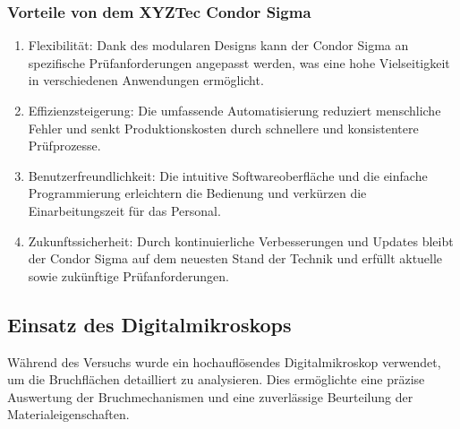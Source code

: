 \subsubsection{Vorteile von dem XYZTec Condor Sigma}
\begin{enumerate}
    \item Flexibilität: Dank des modularen Designs kann der Condor Sigma an spezifische Prüfanforderungen angepasst werden, was eine hohe Vielseitigkeit in verschiedenen Anwendungen ermöglicht.
    \item Effizienzsteigerung: Die umfassende Automatisierung reduziert menschliche Fehler und senkt Produktionskosten durch schnellere und konsistentere Prüfprozesse.
    \item Benutzerfreundlichkeit: Die intuitive Softwareoberfläche und die einfache Programmierung erleichtern die Bedienung und verkürzen die Einarbeitungszeit für das Personal.
    \item Zukunftssicherheit: Durch kontinuierliche Verbesserungen und Updates bleibt der Condor Sigma auf dem neuesten Stand der Technik und erfüllt aktuelle sowie zukünftige Prüfanforderungen.\cite{3}
\end{enumerate}
\subsection{Einsatz des Digitalmikroskops}
Während des Versuchs wurde ein hochauflösendes Digitalmikroskop verwendet, um die Bruchflächen detailliert zu analysieren. Dies ermöglichte eine präzise Auswertung der Bruchmechanismen und eine zuverlässige Beurteilung der Materialeigenschaften.
